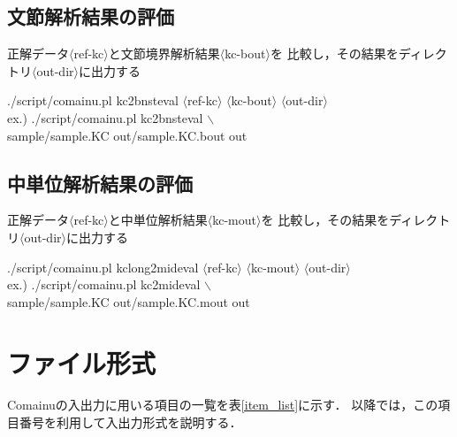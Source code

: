 \documentclass[titlepage]{jarticle}
\begin{document}
\subsection{文節解析結果の評価}\label{eval_bnst}
正解データ$\langle$ref-kc$\rangle$と文節境界解析結果$\langle$kc-bout$\rangle$を
比較し，その結果をディレクトリ$\langle$out-dir$\rangle$に出力する
\begin{screen}
./script/comainu.pl kc2bnsteval $\langle$ref-kc$\rangle$ $\langle$kc-bout$\rangle$ $\langle$out-dir$\rangle$ \\
ex.) ./script/comainu.pl kc2bnsteval $\backslash$ \\
\hspace{10mm} sample/sample.KC out/sample.KC.bout out
\end{screen}


\subsection{中単位解析結果の評価}\label{eval_mid}
正解データ$\langle$ref-kc$\rangle$と中単位解析結果$\langle$kc-mout$\rangle$を
比較し，その結果をディレクトリ$\langle$out-dir$\rangle$に出力する
\begin{screen}
./script/comainu.pl kclong2mideval $\langle$ref-kc$\rangle$ $\langle$kc-mout$\rangle$ $\langle$out-dir$\rangle$ \\
ex.) ./script/comainu.pl kc2mideval $\backslash$ \\
\hspace{10mm} sample/sample.KC out/sample.KC.mout out
\end{screen}


\clearpage


\section{ファイル形式}\label{sec:file_format}

Comainuの入出力に用いる項目の一覧を表\ref{item_list}に示す．
以降では，この項目番号を利用して入出力形式を説明する．
\end{document}
